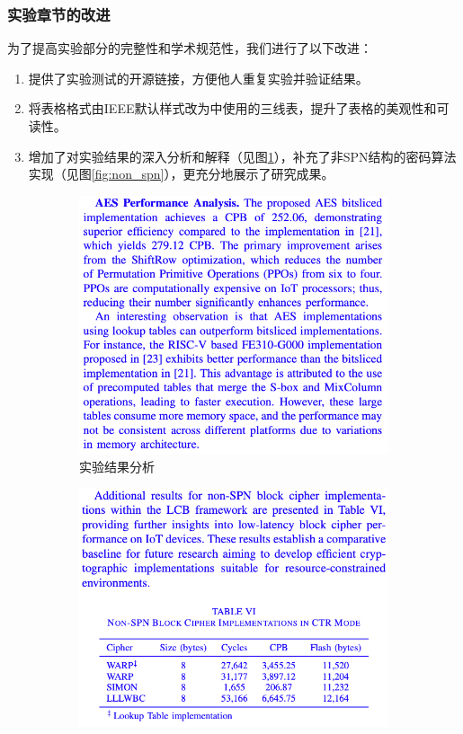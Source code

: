 \documentclass{beamer}
\begin{document}
\begin{frame}
    \frametitle{实验章节的改进}
    为了提高实验部分的完整性和学术规范性，我们进行了以下改进：
    \begin{enumerate}
        \item 提供了实验测试的开源链接，方便他人重复实验并验证结果。
        \item 将表格格式由IEEE默认样式改为\cite{Liu2020}中使用的三线表，提升了表格的美观性和可读性。
        \item 增加了对实验结果的深入分析和解释（见图\ref{fig:experiment_analysis}），补充了非SPN结构的密码算法实现（见图\ref{fig:non_spn}），更充分地展示了研究成果。
    \end{enumerate}
    \begin{figure}[h]
      \centering
      \begin{subfigure}[b]{0.3\textwidth}
        \includegraphics[width=\textwidth]{./fig/aseAnalysis.png}
        \caption{实验结果分析}
        \label{fig:experiment_analysis}
      \end{subfigure}
      \hfill
      \begin{subfigure}[b]{0.3\textwidth}
        \includegraphics[width=\textwidth]{./fig/nonSPN.png}

\end{subfigure}
\end{figure}
\end{frame}
\end{document}
